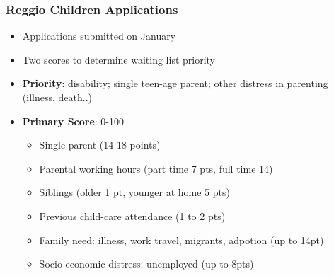 \documentclass[xcolor=table]{beamer}
\begin{document}
\begin{frame}

\end{frame}
\begin{frame}

\end{frame}
\begin{frame}

\end{frame}
\begin{frame}

\end{frame}
\begin{frame}
\frametitle{Reggio Children Applications}\label{frame:ReggioScore}

\begin{itemize}
	\item Applications submitted on January
	\item Two scores to determine waiting list priority
	\vspace{1ex}
	\item \textbf{Priority}: disability; single teen-age parent; other distress in parenting (illness, death..)
	\item \textbf{Primary Score}: 0-100
	\begin{itemize}
		\item Single parent (14-18 points)
		\item Parental working hours (part time 7 pts, full time 14)
		\item Siblings (older 1 pt, younger at home 5 pts)
		\item Previous child-care attendance (1 to 2 pts)
		\item Family need: illness, work travel, migrants, adpotion (up to 14pt)
		\item Socio-economic distress: unemployed (up to 8pts)
	\end{itemize}
\end{itemize}
\end{frame}
\end{document}
